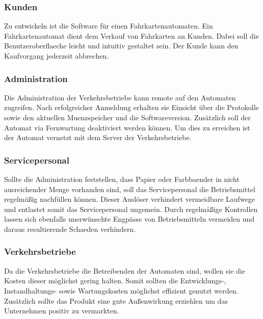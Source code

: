 \documentclass{article}
\begin{document}
    \subsubsection*{Kunden}
    \label{sec:Kunden}
    Zu entwickeln ist die \gls{Software} für einen Fahrkartenautomaten.
    Ein Fahrkartenautomat dient dem Verkauf von Fahrkarten an \gls{Kunden}.
    Dabei soll die \gls{Benutzeroberflaeche} leicht und intuitiv gestaltet sein.
    Der \gls{Kunde} kann den Kaufvorgang jederzeit abbrechen.

    \subsubsection*{Administration}
    \label{sec:Administration}
    Die \gls{Administration} der \gls{Verkehrsbetriebe} kann \gls{remote} auf den Automaten zugreifen.
    Nach erfolgreicher Anmeldung erhalten sie Einsicht über die \gls{Protokolle} sowie den aktuellen \gls{Muenzspeicher} und die \gls{Software}version.
    Zusätzlich soll der Automat via \gls{Fernwartung} deaktiviert werden können.
    Um dies zu erreichen ist der Automat vernetzt mit dem Server der \gls{Verkehrsbetriebe}.
    
    \subsubsection*{Servicepersonal}
    \label{sec:Servicepersonal}
    Sollte die \gls{Administration} feststellen, dass \gls{Papier} oder \gls{Farbbaender} in nicht ausreichender Menge vorhanden sind, soll das Servicepersonal die \gls{Betriebsmittel} regelmäßig nachfüllen können.
    Dieser Auslöser verhindert vermeidbare Laufwege und entlastet somit das \gls{Servicepersonal} ungemein.
    Durch regelmäßige Kontrollen lassen sich ebenfalls unerwünschte Engpässe von \gls{Betriebsmitteln} vermeiden und daraus resultierende \gls{Schaeden} verhindern.

    \subsubsection*{Verkehrsbetriebe}
    \label{sec:Verkehrsbetriebe}
    Da die \gls{Verkehrsbetriebe} die Betreibenden der Automaten sind, wollen sie die \gls{Kosten} dieser möglichst gering halten.
    Somit sollten die Entwicklungs-, Instandhaltungs- sowie Wartungskosten möglichst effizient genutzt werden. 
    Zusätzlich sollte das Produkt eine gute Außenwirkung erziehlen um das Unternehmen positiv zu vermarkten.
\end{document}
